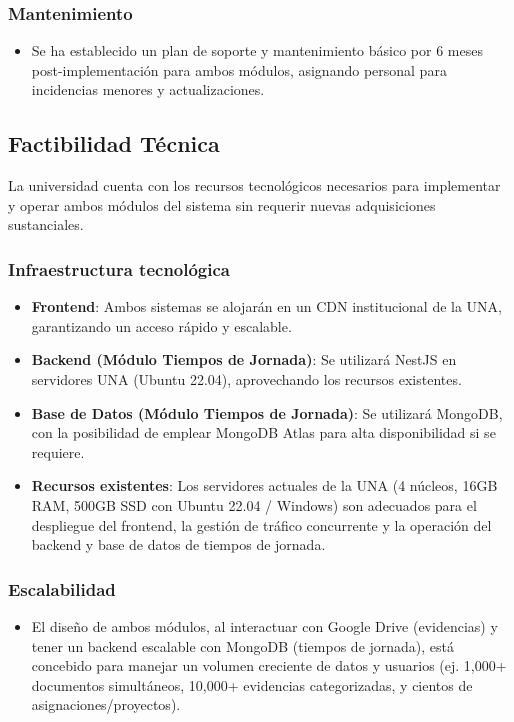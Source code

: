 \subsubsection{Mantenimiento}
\begin{itemize}
    \item Se ha establecido un plan de soporte y mantenimiento básico por 6 meses post-implementación para ambos módulos, asignando personal para incidencias menores y actualizaciones.
\end{itemize}

\subsection{Factibilidad Técnica}
La universidad cuenta con los recursos tecnológicos necesarios para implementar y operar ambos módulos del sistema sin requerir nuevas adquisiciones sustanciales.
\subsubsection{Infraestructura tecnológica}
\begin{itemize}
    \item \textbf{Frontend}: Ambos sistemas se alojarán en un CDN institucional de la UNA, garantizando un acceso rápido y escalable.
    \item \textbf{Backend (Módulo Tiempos de Jornada)}: Se utilizará NestJS en servidores UNA (Ubuntu 22.04), aprovechando los recursos existentes.
    \item \textbf{Base de Datos (Módulo Tiempos de Jornada)}: Se utilizará MongoDB, con la posibilidad de emplear MongoDB Atlas para alta disponibilidad si se requiere.
    \item \textbf{Recursos existentes}: Los servidores actuales de la UNA (4 núcleos, 16GB RAM, 500GB SSD con Ubuntu 22.04 / Windows) son adecuados para el despliegue del frontend, la gestión de tráfico concurrente y la operación del backend y base de datos de tiempos de jornada.
\end{itemize}

\subsubsection{Escalabilidad}
\begin{itemize}
    \item El diseño de ambos módulos, al interactuar con Google Drive (evidencias) y tener un backend escalable con MongoDB (tiempos de jornada), está concebido para manejar un volumen creciente de datos y usuarios (ej. 1,000+ documentos simultáneos, 10,000+ evidencias categorizadas, y cientos de asignaciones/proyectos).
\end{itemize}

